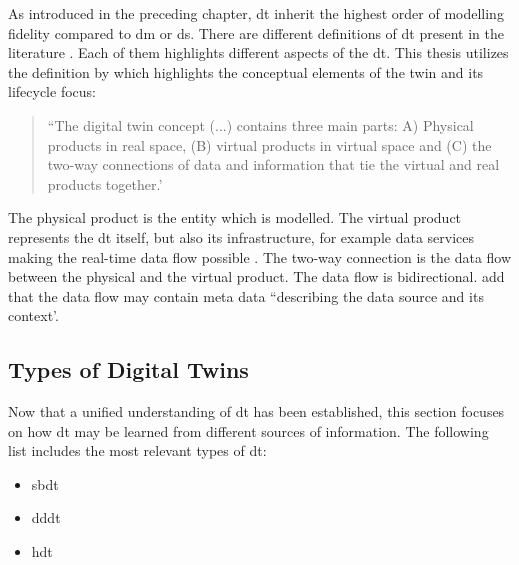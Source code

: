 As introduced in the preceding chapter, \gls{dt} inherit the highest order of modelling fidelity compared to \gls{dm} or \gls{ds}. There are different definitions of \gls{dt} present in the literature \autocite{Negri2017promfg,zheng2019application,glaessgen2012digital,Demkovich2018def,boschert2016digital,grieves2014digital,kritzinger2018digital,Tao2018ijamt,zehnder2018representing}. Each of them highlights different aspects of the \gls{dt}. This thesis utilizes the definition by \textcite{grieves2014digital} which highlights the conceptual elements of the twin and its lifecycle focus:

\begin{quote}
  ``The digital twin concept (...) contains three main parts: A) Physical products in real space, (B) virtual products in virtual space and (C) the two-way connections of data and information that tie the virtual and real products together.' \autocite{grieves2014digital}
\end{quote}

The physical product is the entity which is modelled. The virtual product represents the \gls{dt} itself, but also its infrastructure, for example data services making the real-time data flow possible \autocite{Tao2018ijamt}. The two-way connection is the data flow between the physical and the virtual product. The data flow is bidirectional. \textcite{zehnder2018representing} add that the data flow may contain meta data ``describing the data source and its context'.

\subsection*{Types of Digital Twins}
\label{sec:types-digital-twins}
Now that a unified understanding of \gls{dt} has been established, this section focuses on how \gls{dt} may be learned from different sources of information. The following list includes the most relevant types of \gls{dt}:

\begin{itemize}
  \item \gls{sbdt} \autocite{Lugaresi2021aifac,martinez2018automatic}
  \item \gls{dddt} \autocite{he2019data,Friederich2022}
  \item \gls{hdt} \autocite{luo2020hybrid,huang2023hybrid}
\end{itemize}


